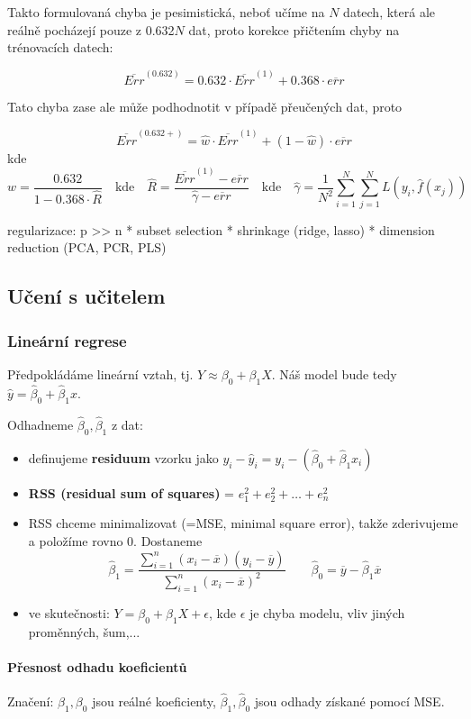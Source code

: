 \documentclass[11pt]{report} %
\numberwithin{equation}{section}
\begin{document}
Takto formulovaná chyba je pesimistická, neboť učíme na $N$ datech, která ale reálně pocházejí pouze z 0.632$N$ dat, proto korekce přičtením chyby na trénovacích datech:

$$\overline{Err}^{(0.632)} = 0.632\cdot \overline{Err}^{(1)} + 0.368 \cdot \overline{err}$$

Tato chyba zase ale může podhodnotit v případě přeučených dat, proto 

$$\overline{Err}^{(0.632+)} = \hat{w}\cdot \overline{Err}^{(1)} + (1-\hat{w})\cdot \overline{err}$$
kde
$$w = \frac{0.632}{1 - 0.368\cdot\hat{R}}
\quad \text{kde}\quad 
\hat{R} = \frac{\overline{Err}^{(1)} - \overline{err}}{\hat{\gamma} - \overline{err}}
\quad \text{kde}\quad 
\hat{\gamma} = \frac{1}{N^2}\sum_{i=1}^{N}\sum_{j=1}^{N}L(y_i,\hat{f}(x_j))
$$


regularizace: p >> n
* subset selection
* shrinkage (ridge, lasso)
* dimension reduction (PCA, PCR, PLS)


\subsection{Učení s učitelem}
\subsubsection{Lineární regrese}
Předpokládáme lineární vztah, tj. $Y \approx \beta_0 + \beta_1 X$. Náš model bude tedy $\hat{y} = \hat{\beta}_0 + \hat{\beta}_1 x$. 

Odhadneme $\hat{\beta}_0, \hat{\beta}_1$ z dat: 
\begin{itemize}
	\item definujeme \textbf{residuum} vzorku jako $y_i - \hat{y}_i = y_i - (\hat\beta_0 + \hat\beta_1x_i)$
	\item \textbf{RSS (residual sum of squares)} = $e_1^2 + e_2^2 + \dots + e_n^2$
	\item RSS chceme minimalizovat (=MSE, minimal square error), takže zderivujeme a položíme rovno 0. Dostaneme
	$$\hat\beta_1 = \frac{\sum_{i=1}^{n}(x_i-\overline{x})(y_i - \overline{y})}{\sum_{i=1}^{n}(x_i-\overline{x})^2}
	\qquad
	\hat\beta_0 = \overline{y} - \hat\beta_1\overline{x}$$
	\item ve skutečnosti: $Y =\beta_0 + \beta_1 X + \epsilon$, kde $\epsilon$ je chyba modelu, vliv jiných proměnných, šum,...	
\end{itemize}

\paragraph{Přesnost odhadu koeficientů}
Značení: $\beta_1, \beta_0$ jsou reálné koeficienty, $\hat{\beta}_1, \hat{\beta}_0$ jsou odhady získané pomocí MSE.
\end{document}
